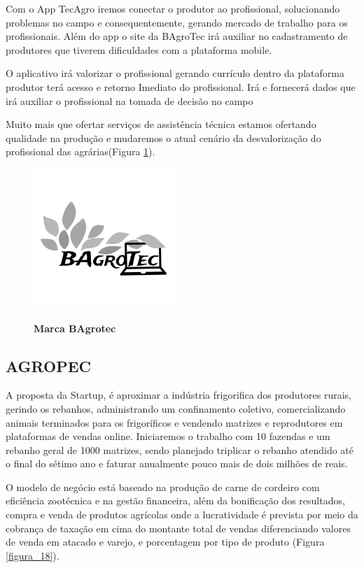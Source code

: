 Com o App TecAgro iremos conectar o produtor ao profissional, solucionando problemas no campo e consequentemente, gerando mercado de trabalho para os profissionais. Além do app o site da BAgroTec irá auxiliar no cadastramento de produtores que tiverem dificuldades com a plataforma mobile.  

O aplicativo irá valorizar o profissional gerando currículo dentro da plataforma  produtor terá acesso e retorno Imediato do profissional. Irá e fornecerá dados que irá auxiliar o profissional na tomada de decisão no campo

Muito mais que ofertar serviços de assistência técnica estamos ofertando qualidade na produção e mudaremos o atual cenário da desvalorização do profissional das agrárias(Figura \ref{figura_15}).

\begin{figure}[H]
\centering
\caption{\textbf{Marca BAgrotec}}
\includegraphics[scale=1.0]{Imagens/bagrotec.png}
\label{figura_15}
\end{figure}


\subsection{AGROPEC}


A proposta da Startup, é aproximar a indústria frigorifica dos  produtores rurais, gerindo os rebanhos, administrando um 
confinamento coletivo, comercializando animais terminados para os frigoríficos e vendendo matrizes e reprodutores em plataformas de vendas online. Iniciaremos o trabalho com 10 fazendas e um rebanho geral de 1000 matrizes, sendo planejado triplicar o rebanho atendido até o final do sétimo ano e faturar anualmente pouco mais de dois milhões de reais.

O modelo de negócio está baseado na produção de carne de  cordeiro com eficiência zootécnica e na gestão financeira, além 
da bonificação dos resultados, compra e venda de produtos  agrícolas onde a lucratividade é prevista por meio da cobrança de taxação em cima do montante total de vendas diferenciando valores de venda em atacado e varejo, e porcentagem por tipo de produto (Figura \ref{figura_18}).


